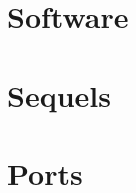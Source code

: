 \documentclass[8pt]{book}
\begin{document}
    \chapter{Software}
      
      

    \chapter{Sequels}
         

    \chapter{Ports}        
          

    \appendix
    \appendixpage
          
      
    \cleartoleftpage %
    
    \blankpage
    \blankpage
\end{document}
